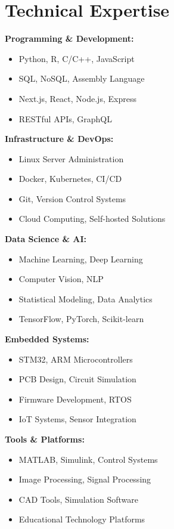 \documentclass[11pt,a4paper]{article}
\begin{document}
\section{Technical Expertise}
\begin{multicols}{2}
\small
\textbf{Programming \& Development:}
\begin{itemize}[leftmargin=15pt, noitemsep, topsep=1pt]
    \item Python, R, C/C++, JavaScript
    \item SQL, NoSQL, Assembly Language
    \item Next.js, React, Node.js, Express
    \item RESTful APIs, GraphQL
\end{itemize}

\textbf{Infrastructure \& DevOps:}
\begin{itemize}[leftmargin=15pt, noitemsep, topsep=1pt]
    \item Linux Server Administration
    \item Docker, Kubernetes, CI/CD
    \item Git, Version Control Systems
    \item Cloud Computing, Self-hosted Solutions
\end{itemize}

\textbf{Data Science \& AI:}
\begin{itemize}[leftmargin=15pt, noitemsep, topsep=1pt]
    \item Machine Learning, Deep Learning
    \item Computer Vision, NLP
    \item Statistical Modeling, Data Analytics
    \item TensorFlow, PyTorch, Scikit-learn
\end{itemize}

\textbf{Embedded Systems:}
\begin{itemize}[leftmargin=15pt, noitemsep, topsep=1pt]
    \item STM32, ARM Microcontrollers
    \item PCB Design, Circuit Simulation
    \item Firmware Development, RTOS
    \item IoT Systems, Sensor Integration
\end{itemize}

\textbf{Tools \& Platforms:}
\begin{itemize}[leftmargin=15pt, noitemsep, topsep=1pt]
    \item MATLAB, Simulink, Control Systems
    \item Image Processing, Signal Processing
    \item CAD Tools, Simulation Software
    \item Educational Technology Platforms
\end{itemize}
\end{multicols}
\end{document}
